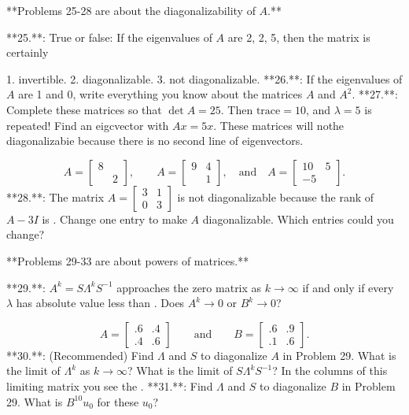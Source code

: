 

**Problems 25-28 are about the diagonalizability of \(A\).**

**25.**: True or false: If the eigenvalues of \(A\) are 2, 2, 5, then the matrix is certainly

1. invertible.
2. diagonalizable.
3. not diagonalizable.
**26.**: If the eigenvalues of \(A\) are 1 and 0, write everything you know about the matrices \(A\) and \(A^{2}\).
**27.**: Complete these matrices so that \(\det A=25\). Then \(\text{trace}=10\), and \(\lambda=5\) is repeated! Find an eigcvector with \(Ax=5x\). These matrices will nothe diagonalizabie because there is no second line of eigenvectors.

\[A=\begin{bmatrix}8\\ &2\end{bmatrix},\qquad A=\begin{bmatrix}9&4\\ &1\end{bmatrix},\quad\text{and}\quad A=\begin{bmatrix}10&5\\ -5\end{bmatrix}.\]
**28.**: The matrix \(A=\begin{bmatrix}3&1\\ 0&3\end{bmatrix}\) is not diagonalizable because the rank of \(A-3I\) is . Change one entry to make \(A\) diagonalizable. Which entries could you change?

**Problems 29-33 are about powers of matrices.**

**29.**: \(A^{k}=S\Lambda^{k}S^{-1}\) approaches the zero matrix as \(k\to\infty\) if and only if every \(\lambda\) has absolute value less than . Does \(A^{k}\to 0\) or \(B^{k}\to 0\)?

\[A=\begin{bmatrix}.6&.4\\ .4&.6\end{bmatrix}\qquad\text{and}\qquad B=\begin{bmatrix}.6&.9\\ .1&.6\end{bmatrix}.\]
**30.**: (Recommended) Find \(\Lambda\) and \(S\) to diagonalize \(A\) in Problem 29. What is the limit of \(\Lambda^{k}\) as \(k\to\infty\)? What is the limit of \(S\Lambda^{k}S^{-1}\)? In the columns of this limiting matrix you see the .
**31.**: Find \(\Lambda\) and \(S\) to diagonalize \(B\) in Problem 29. What is \(B^{10}u_{0}\) for these \(u_{0}\)?

